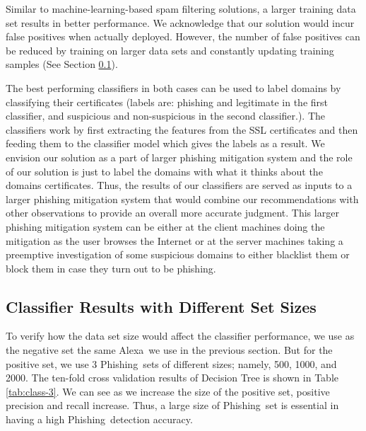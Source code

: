 \documentclass[twocolumn]{article}
\newcommand{\Alexa}{\textsf{Alexa}}
\newcommand{\phishing}{\textsf{Phishing}}
\begin{document}
Similar to machine-learning-based spam filtering solutions, a larger training data set results in better performance.
We acknowledge that our solution would incur false positives when actually deployed. However, the number of false positives
can be reduced by training on larger data sets and constantly updating training samples (See Section \ref{setsizes}).

The best performing classifiers in both cases can be used to label domains by classifying their certificates (labels are: phishing and legitimate in the first classifier, and suspicious and non-suspicious in the second classifier.).  The classifiers work by first extracting the features from the SSL certificates and then feeding them to the classifier model which gives the labels as a result. We envision our solution as a part of larger phishing mitigation system and the role of our solution is just to label the domains with what it thinks about the domains certificates. Thus, the results of our classifiers are served as inputs to a larger phishing mitigation system that would combine our recommendations with other observations to provide an overall more accurate judgment. This larger phishing mitigation system can be either at the client machines doing the mitigation as the user browses the Internet or  at the server machines taking a preemptive investigation of some suspicious domains to either blacklist them or block them in case they turn out to be phishing.  


\subsection{Classifier Results with Different Set Sizes}\label{setsizes}
To verify how the data set size would affect the classifier performance, we use as the negative set the same \Alexa\ we use in the previous section. But for the positive set, we use 3 \phishing\ sets of different sizes; namely, 500, 1000, and 2000. The ten-fold cross validation results of Decision Tree is shown in Table \ref{tab:class-3}. We can see as we increase the size of the positive set, positive precision and recall increase. Thus, a large size of \phishing\ set is essential in having a high \phishing\ detection accuracy. 
\end{document}
